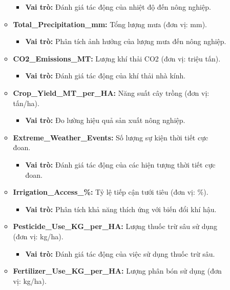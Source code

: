 \begin{description}
\begin{itemize}
\begin{itemize}
\begin{itemize}
                \item \textbf{Vai trò:} Đánh giá tác động của nhiệt độ đến nông nghiệp.
            \end{itemize}
            \item \textbf{Total\_Precipitation\_mm:} Tổng lượng mưa (đơn vị: mm).
            \begin{itemize}
                \item \textbf{Vai trò:} Phân tích ảnh hưởng của lượng mưa đến nông nghiệp.
            \end{itemize}
            \item \textbf{CO2\_Emissions\_MT:} Lượng khí thải CO2 (đơn vị: triệu tấn).
            \begin{itemize}
                \item \textbf{Vai trò:} Đánh giá tác động của khí thải nhà kính.
            \end{itemize}
            \item \textbf{Crop\_Yield\_MT\_per\_HA:} Năng suất cây trồng (đơn vị: tấn/ha).
            \begin{itemize}
                \item \textbf{Vai trò:} Đo lường hiệu quả sản xuất nông nghiệp.
            \end{itemize}
            \item \textbf{Extreme\_Weather\_Events:} Số lượng sự kiện thời tiết cực đoan.
            \begin{itemize}
                \item \textbf{Vai trò:} Đánh giá tác động của các hiện tượng thời tiết cực đoan.
            \end{itemize}
            \item \textbf{Irrigation\_Access\_\%:} Tỷ lệ tiếp cận tưới tiêu (đơn vị: \%).
            \begin{itemize}
                \item \textbf{Vai trò:} Phân tích khả năng thích ứng với biến đổi khí hậu.
            \end{itemize}
            \item \textbf{Pesticide\_Use\_KG\_per\_HA:} Lượng thuốc trừ sâu sử dụng (đơn vị: kg/ha).
            \begin{itemize}
                \item \textbf{Vai trò:} Đánh giá tác động của việc sử dụng thuốc trừ sâu.
            \end{itemize}
            \item \textbf{Fertilizer\_Use\_KG\_per\_HA:} Lượng phân bón sử dụng (đơn vị: kg/ha).

\end{itemize}
\end{itemize}
\end{description}
